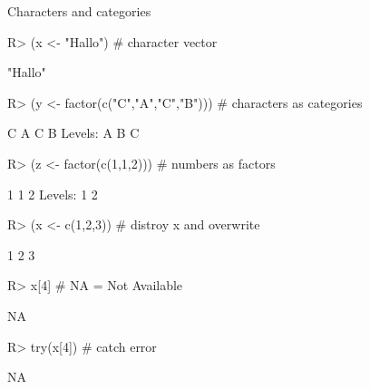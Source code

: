 \documentclass[10pt]{beamer}
\begin{document}
\begin{frame}[fragile]{Characters and categories}
\begin{Schunk}
\begin{Sinput}
R> (x <- "Hallo")                     # character vector
\end{Sinput}
\begin{Soutput}
[1] "Hallo"
\end{Soutput}
\begin{Sinput}
R> (y <- factor(c("C","A","C","B")))  # characters as categories
\end{Sinput}
\begin{Soutput}
[1] C A C B
Levels: A B C
\end{Soutput}
\begin{Sinput}
R> (z <- factor(c(1,1,2)))            # numbers as factors
\end{Sinput}
\begin{Soutput}
[1] 1 1 2
Levels: 1 2
\end{Soutput}
\begin{Sinput}
R> (x <- c(1,2,3))                    # distroy x and overwrite
\end{Sinput}
\begin{Soutput}
[1] 1 2 3
\end{Soutput}
\begin{Sinput}
R> x[4]                               # NA = Not Available
\end{Sinput}
\begin{Soutput}
[1] NA
\end{Soutput}
\begin{Sinput}
R> try(x[4])                          # catch error
\end{Sinput}
\begin{Soutput}
[1] NA
\end{Soutput}
\end{Schunk}
\end{frame}
\end{document}
